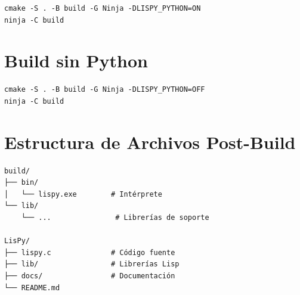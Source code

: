 \begin{verbatim}
cmake -S . -B build -G Ninja -DLISPY_PYTHON=ON
ninja -C build
\end{verbatim}

\section*{Build sin Python}

\begin{verbatim}
cmake -S . -B build -G Ninja -DLISPY_PYTHON=OFF
ninja -C build
\end{verbatim}

\section*{Estructura de Archivos Post-Build}

\begin{verbatim}
build/
├── bin/
│   └── lispy.exe        # Intérprete
└── lib/
    └── ...               # Librerías de soporte

LisPy/
├── lispy.c              # Código fuente
├── lib/                 # Librerías Lisp
├── docs/                # Documentación
└── README.md
\end{verbatim}

